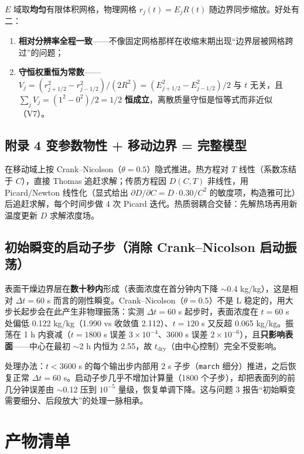 \documentclass[11pt]{ctexart}
\begin{document}
$E$ 域取\textbf{均匀}有限体积网格，物理网格 $r_j(t)=E_j R(t)$ 随边界同步缩放。好处有二：

\begin{enumerate}
\item \textbf{相对分辨率全程一致}——不像固定网格那样在收缩末期出现``边界层被网格跨过''的问题；
\item \textbf{守恒权重恒为常数}——$V_j=(r_{j+1/2}^2-r_{j-1/2}^2)/(2R^2)=(E_{j+1/2}^2-E_{j-1/2}^2)/2$ 与 $t$ 无关，且 $\sum_jV_j=(1^2-0^2)/2=1/2$ \textbf{恒成立}，离散质量守恒是恒等式而非近似（V7）。
\end{enumerate}

\subsection{附录 4 变参数物性 + 移动边界 = 完整模型}

在移动域上按 Crank--Nicolson（$\theta = 0.5$）隐式推进。热方程对 $T$ 线性（系数冻结于 $C$），直接 Thomas 追赶求解；传质方程因 $D(C,T)$ 非线性，用 Picard/Newton 线性化（显式给出 $\partial D/\partial C = D\cdot0.30/C^2$ 的敏度项，构造雅可比）后追赶求解，每个时间步做 4 次 Picard 迭代。热质弱耦合交替：先解热场再用新温度更新 $D$ 求解浓度场。

\subsection{初始瞬变的启动子步（消除 Crank--Nicolson 启动振荡）}

表面干燥边界层在\textbf{数十秒内}形成（表面浓度在首分钟内下降 $\sim$0.4 kg/kg），这是相对 $\Delta t = 60$ s 而言的刚性瞬变。Crank--Nicolson（$\theta=0.5$）不是 L 稳定的，用大步长起步会在此产生非物理振荡：实测 $\Delta t = 60$ s 起步时，表面浓度在 $t=60$ s 处偏低 0.122 kg/kg（1.990 vs 收敛值 2.112）、$t=120$ s 又反超 0.065 kg/kg。振荡在 1 h 内衰减（$t=1800$ s 误差 $3\times10^{-4}$、3600 s 误差 $2\times10^{-6}$），且\textbf{只影响表面}——中心在最初 $\sim$2 h 内恒为 2.55，故 $t_\text{dry}$（由中心控制）完全不受影响。

处理办法：$t<3600$ s 的每个输出步内部用 2 s 子步（\texttt{march} 细分）推进，之后恢复正常 $\Delta t = 60$ s。启动子步几乎不增加计算量（1800 个子步），却把表面列的前几分钟误差由 $\sim$0.12 压到 $10^{-5}$ 量级，恢复单调下降。这与问题 3 报告``初始瞬变需要细分、后段放大''的处理一脉相承。

\section{产物清单}
\end{document}
